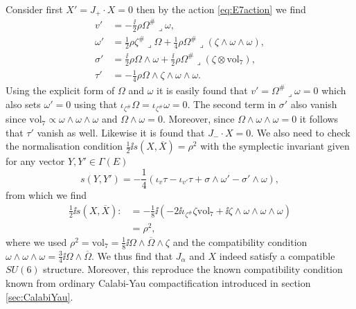 Consider first $X'=J_+\cdot X=0$ then by the action \eqref{eq:E7action} we find 
\begin{equation}
    \begin{aligned}
        v' &= -\frac{\ii}{2}\rho\Omega^{\#}\lrcorner\omega,\\
        \omega' &= \frac{1}{2}\rho\zeta^{\#}\lrcorner \Omega+\frac{1}{4}\rho\Omega^{\#}\lrcorner (\zeta\wedge\omega\wedge\omega),\\
        \sigma' &= \frac{\ii}{2}\rho\Omega\wedge \omega+\frac{\ii}{2}\rho \Omega^{\#}\lrcorner (\zeta\otimes \text{vol}_7),\\
        \tau' &= -\frac{1}{4}\rho \Omega\wedge\zeta\wedge\omega\wedge\omega. 
    \end{aligned}
\end{equation}
Using the explicit form of $\Omega$ and $\omega$ it is easily found that $v'=\Omega^{\#}\lrcorner \omega = 0$ which also sets $\omega'=0$ using that $\iota_{\zeta^{\#}}\Omega=\iota_{\zeta^{\#}}\omega=0$. The second term in $\sigma'$ also vanish since $\text{vol}_7\propto \omega\wedge\omega\wedge\omega$ and $\Omega\wedge\omega =0$. Moreover, since $\Omega\wedge\omega\wedge\omega=0$ it follows that $\tau'$ vanish as well. Likewise it is found that $J_-\cdot X = 0$. We also need to check the normalisation condition $\frac{1}{2}\ii s(X,\overbar{X})=\rho^2$ with the symplectic invariant given for any vector $Y,Y'\in\Gamma(E)$
\begin{equation}
    s(Y,Y') = -\frac{1}{4}(\iota_{v}\tau-\iota_{v'}\tau+\sigma\wedge\omega'-\sigma'\wedge\omega), 
\end{equation}
from which we find 
\begin{equation}
    \begin{aligned}
    \frac{1}{2}\ii s(X,\overbar{X}):&= -\frac{1}{8}\ii \left(-2\ii\iota_{\zeta^{\#}}\zeta\text{vol}_7+\ii\zeta\wedge\omega\wedge\omega\wedge\omega\right)\\
    &= \rho^2,
    \end{aligned}
\end{equation}
where we used $\rho^2=\text{vol}_7=\frac{1}{8}\ii\Omega\wedge\overbar{\Omega}\wedge\zeta$ and the compatibility condition $\omega\wedge\omega\wedge\omega=\frac{3}{4}\ii\Omega\wedge\overbar{\Omega}$. We thus find that $J_\alpha$ and $X$ indeed satisfy a compatible $SU(6)$ structure. Moreover, this reproduce the known compatibility condition known from ordinary Calabi-Yau compactification introduced in section \ref{sec:CalabiYau}. 



